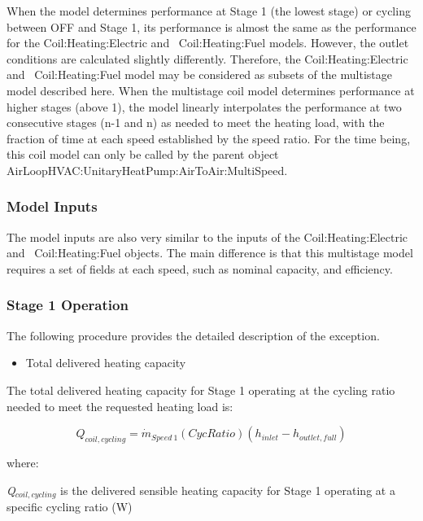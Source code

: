 When the model determines performance at Stage 1 (the lowest stage) or cycling between OFF and Stage 1, its performance is almost the same as the performance for the Coil:Heating:Electric and~ Coil:Heating:Fuel models. However, the outlet conditions are calculated slightly differently. Therefore, the Coil:Heating:Electric and~ Coil:Heating:Fuel model may be considered as subsets of the multistage model described here. When the multistage coil model determines performance at higher stages (above 1), the model linearly interpolates the performance at two consecutive stages (n-1 and n) as needed to meet the heating load, with the fraction of time at each speed established by the speed ratio. For the time being, this coil model can only be called by the parent object AirLoopHVAC:UnitaryHeatPump:AirToAir:MultiSpeed.

\subsubsection{Model Inputs}\label{model-inputs-1}

The model inputs are also very similar to the inputs of the Coil:Heating:Electric and~ Coil:Heating:Fuel objects. The main difference is that this multistage model requires a set of fields at each speed, such as nominal capacity, and efficiency.

\subsubsection{Stage 1 Operation}\label{stage-1-operation}

The following procedure provides the detailed description of the exception.

\begin{itemize}
  \item Total delivered heating capacity
\end{itemize}

The total delivered heating capacity for Stage 1 operating at the cycling ratio needed to meet the requested heating load is:

\begin{equation}
  Q_{coil,cycling} = {\dot{m}_{Speed~1}} \left( CycRatio \right) (h_{inlet} - h_{outlet,full})
\end{equation}

where:

\emph{Q\(_{coil,cycling}\)} is the delivered sensible heating capacity for Stage 1 operating at a specific cycling ratio (W)

